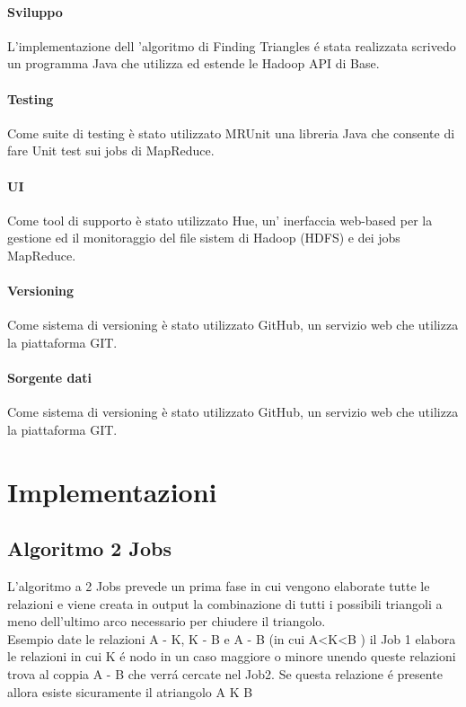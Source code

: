 \documentclass[paper=a4, fontsize=11pt]{scrartcl}	%
\numberwithin{equation}{section}															%
\numberwithin{figure}{section}																%
\numberwithin{table}{section}																%
\begin{document}
\paragraph{Sviluppo}
L'implementazione dell 'algoritmo di Finding Triangles  \'e stata realizzata scrivedo un programma Java che utilizza ed estende le Hadoop API di Base.
\paragraph{Testing}
Come suite di testing \`e stato utilizzato MRUnit una libreria Java che consente di fare Unit test sui jobs di MapReduce.
\paragraph{UI}
Come tool di supporto \`e stato utilizzato Hue, un' inerfaccia web-based per la gestione ed il monitoraggio del file sistem di Hadoop (HDFS) e dei jobs MapReduce.
\paragraph{Versioning}
Come sistema di versioning \`e stato utilizzato GitHub, un servizio web che utilizza la piattaforma GIT.
\paragraph{Sorgente dati}
Come sistema di versioning \`e stato utilizzato GitHub, un servizio web che utilizza la piattaforma GIT.


\section{Implementazioni}
\subsection{Algoritmo 2 Jobs}
L'algoritmo a 2 Jobs prevede un prima fase in cui vengono elaborate tutte le relazioni e viene creata in output la combinazione di tutti i possibili triangoli a meno dell'ultimo arco necessario per chiudere il triangolo.\\
Esempio date le relazioni A - K, K - B e A - B  (in cui A<K<B ) il Job 1 elabora le relazioni in cui K \'e nodo in un caso maggiore o minore unendo queste relazioni trova al coppia A - B che verr\'a cercate nel Job2. Se questa relazione \'e presente allora esiste sicuramente il atriangolo A K B
\end{document}
